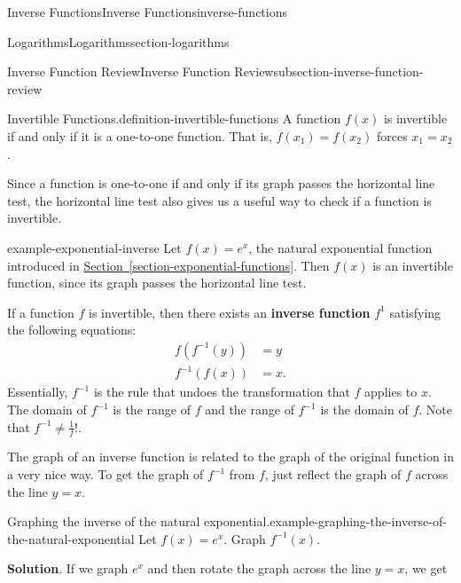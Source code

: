 \documentclass[oneside,10pt,]{book}
\newcommand{\terminology}[1]{\textbf{#1}}
\numberwithin{equation}{section}
\begin{document}
\begin{chapterptx}{Inverse Functions}{}{Inverse Functions}{}{}{inverse-functions}
\begin{sectionptx}{Logarithms}{}{Logarithms}{}{}{section-logarithms}
\begin{subsectionptx}{Inverse Function Review}{}{Inverse Function Review}{}{}{subsection-inverse-function-review}
\begin{definition}{Invertible Functions.}{definition-invertible-functions}
\hypertarget{p-199}{}%
A function \(f(x)\) is invertible if and only if it is a one-to-one function. That is, \(f(x_{1}) = f(x_{2})\) forces \(x_{1} = x_{2}\).%
\end{definition}
\hypertarget{p-200}{}%
Since a function is one-to-one if and only if its graph passes the horizontal line test, the horizontal line test also gives us a useful way to check if a function is invertible.%
\begin{example}{}{example-exponential-inverse}%
\hypertarget{p-201}{}%
Let \(f(x) = e^{x}\), the natural exponential function introduced in \hyperref[section-exponential-functions]{Section~\ref{section-exponential-functions}}. Then \(f(x)\) is an invertible function, since its graph passes the horizontal line test.%
\end{example}
\hypertarget{p-202}{}%
If a function \(f\) is invertible, then there exists an \terminology{inverse function} \(f^{1}\) satisfying the following equations:%
\begin{align*}
f(f^{-1}(y)) & = y \\
f^{-1}(f(x)) & = x. 
\end{align*}
Essentially, \(f^{-1}\) is the rule that undoes the transformation that \(f\) applies to \(x\). The domain of \(f^{-1}\) is the range of \(f\) and the range of \(f^{-1}\) is the domain of \(f\). Note that \(f^{-1}\neq\frac{1}{f}\)!.%
\par
\hypertarget{p-203}{}%
The graph of an inverse function is related to the graph of the original function in a very nice way. To get the graph of \(f^{-1}\) from \(f\), just reflect the graph of \(f\) across the line \(y=x\).%
\begin{example}{Graphing the inverse of the natural exponential.}{example-graphing-the-inverse-of-the-natural-exponential}%
\hypertarget{p-204}{}%
Let \(f(x) = e^{x}\). Graph \(f^{-1}(x)\).%
\par\smallskip%
\noindent\textbf{Solution}.\hypertarget{solution-44}{}\quad%
\hypertarget{p-205}{}%
If we graph \(e^{x}\) and then rotate the graph across the line \(y=x\), we get%
\begin{figure}
\centering
{
}
\end{figure}
\end{example}
\end{subsectionptx}
\end{sectionptx}
\end{chapterptx}
\end{document}

